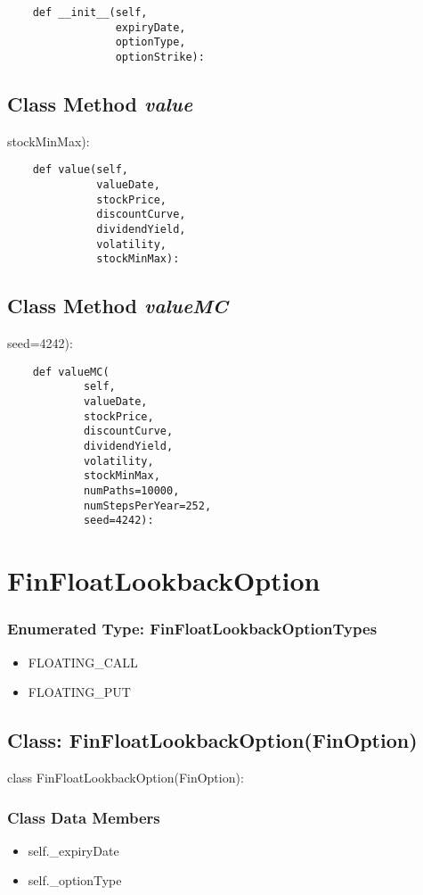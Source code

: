 \documentclass[twoside,11pt]{book}
\begin{document}
\begin{lstlisting}
    def __init__(self,
                 expiryDate,
                 optionType,
                 optionStrike):
\end{lstlisting}

\subsection{Class Method {\it value}}
stockMinMax):

\begin{lstlisting}
    def value(self,
              valueDate,
              stockPrice,
              discountCurve,
              dividendYield,
              volatility,
              stockMinMax):
\end{lstlisting}

\subsection{Class Method {\it valueMC}}
seed=4242):

\begin{lstlisting}
    def valueMC(
            self,
            valueDate,
            stockPrice,
            discountCurve,
            dividendYield,
            volatility,
            stockMinMax,
            numPaths=10000,
            numStepsPerYear=252,
            seed=4242):
\end{lstlisting}

\newpage
\section{FinFloatLookbackOption}

\subsubsection{Enumerated Type: FinFloatLookbackOptionTypes}
\begin{itemize}
\item{FLOATING\_CALL}
\item{FLOATING\_PUT}
\end{itemize}

\subsection{Class: FinFloatLookbackOption(FinOption)}
class FinFloatLookbackOption(FinOption):

\subsubsection{Class Data Members}
\begin{itemize}
\item{self.\_expiryDate}
\item{self.\_optionType}
\end{itemize}
\end{document}
